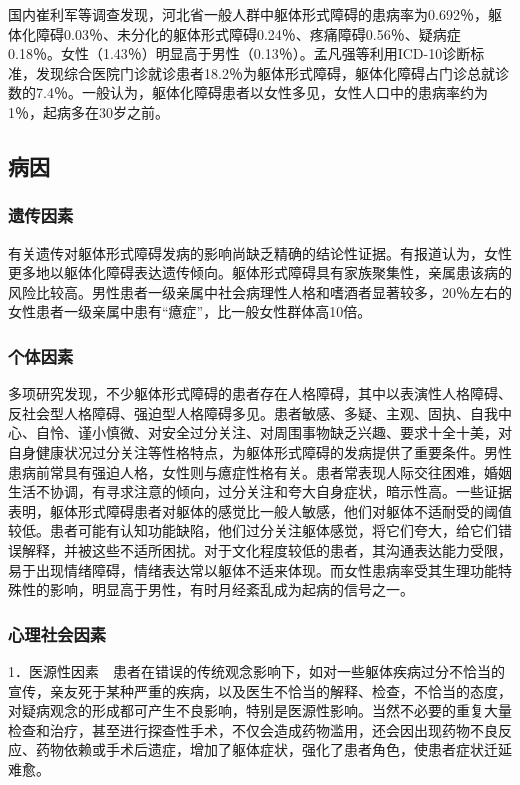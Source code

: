 国内崔利军等调查发现，河北省一般人群中躯体形式障碍的患病率为0.692％，躯体化障碍0.03％、未分化的躯体形式障碍0.24％、疼痛障碍0.56％、疑病症0.18％。女性（1.43％）明显高于男性（0.13％）。孟凡强等利用ICD-10诊断标准，发现综合医院门诊就诊患者18.2％为躯体形式障碍，躯体化障碍占门诊总就诊数的7.4％。一般认为，躯体化障碍患者以女性多见，女性人口中的患病率约为1％，起病多在30岁之前。

\subsection{病因}

\subsubsection{遗传因素}

有关遗传对躯体形式障碍发病的影响尚缺乏精确的结论性证据。有报道认为，女性更多地以躯体化障碍表达遗传倾向。躯体形式障碍具有家族聚集性，亲属患该病的风险比较高。男性患者一级亲属中社会病理性人格和嗜酒者显著较多，20％左右的女性患者一级亲属中患有“癔症”，比一般女性群体高10倍。

\subsubsection{个体因素}

多项研究发现，不少躯体形式障碍的患者存在人格障碍，其中以表演性人格障碍、反社会型人格障碍、强迫型人格障碍多见。患者敏感、多疑、主观、固执、自我中心、自怜、谨小慎微、对安全过分关注、对周围事物缺乏兴趣、要求十全十美，对自身健康状况过分关注等性格特点，为躯体形式障碍的发病提供了重要条件。男性患病前常具有强迫人格，女性则与癔症性格有关。患者常表现人际交往困难，婚姻生活不协调，有寻求注意的倾向，过分关注和夸大自身症状，暗示性高。一些证据表明，躯体形式障碍患者对躯体的感觉比一般人敏感，他们对躯体不适耐受的阈值较低。患者可能有认知功能缺陷，他们过分关注躯体感觉，将它们夸大，给它们错误解释，并被这些不适所困扰。对于文化程度较低的患者，其沟通表达能力受限，易于出现情绪障碍，情绪表达常以躯体不适来体现。而女性患病率受其生理功能特殊性的影响，明显高于男性，有时月经紊乱成为起病的信号之一。

\subsubsection{心理社会因素}

1．医源性因素　患者在错误的传统观念影响下，如对一些躯体疾病过分不恰当的宣传，亲友死于某种严重的疾病，以及医生不恰当的解释、检查，不恰当的态度，对疑病观念的形成都可产生不良影响，特别是医源性影响。当然不必要的重复大量检查和治疗，甚至进行探查性手术，不仅会造成药物滥用，还会因出现药物不良反应、药物依赖或手术后遗症，增加了躯体症状，强化了患者角色，使患者症状迁延难愈。

